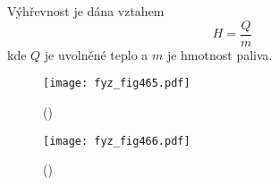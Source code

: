       Výhřevnost je dána vztahem
      \begin{equation*}
        H=\dfrac{Q}{m}
      \end{equation*}
      kde \(Q\) je uvolněné teplo a \(m\) je hmotnost paliva. 

      
      
      
    \begin{figure}[ht!] %
      \centering
      \texttt{[image: fyz\_fig465.pdf]}
      \caption{ 
               (\cite[s.~707]{Feynman01})}
      \label{fyz:fig465}
    \end{figure}

    \begin{figure}[ht!] %
      \centering
      \texttt{[image: fyz\_fig466.pdf]}
      \caption{ 
               (\cite[s.~707]{Feynman01})}
      \label{fyz:fig466}
    \end{figure}
    
